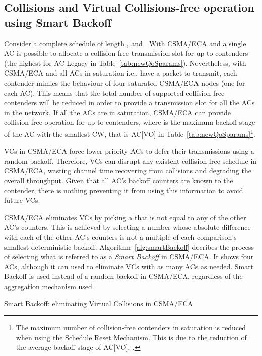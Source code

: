 \documentclass[a4paper]{article}
\begin{document}
\subsection{Collisions and Virtual Collisions-free operation using Smart Backoff}\label{ECAqosCollisionFree}
Consider a complete schedule of length , and . With CSMA/ECA and a single AC is possible to allocate a collision-free transmission slot for up to  contenders (the highest  for AC Legacy in Table~\ref{tab:newQoSparams}). Nevertheless, with CSMA/ECA and all ACs in saturation i.e., have a packet to transmit, each contender mimics the behaviour of four saturated CSMA/ECA nodes (one for each AC). This means that the total number of supported collision-free contenders will be reduced in order to provide a transmission slot for all the ACs in the network. If all the ACs are in saturation, CSMA/ECA can provide collision-free operation for up to  contenders, where  is the maximum backoff stage of the AC with the smallest CW, that is AC[VO] in Table~\ref{tab:newQoSparams}\footnote{The maximum number of collision-free contenders in saturation is reduced when using the Schedule Reset Mechanism. This is due to the reduction of the average backoff stage of AC[VO], .}. 



VCs in CSMA/ECA force lower priority ACs to defer their transmissions using a random backoff. Therefore, VCs can disrupt any existent collision-free schedule in CSMA/ECA, wasting channel time recovering from collisions and degrading the overall throughput. Given that all AC's backoff counters are known to the contender, there is nothing preventing it from using this information to avoid future VCs.

CSMA/ECA eliminates VCs by picking a  that is not equal to any of the other AC's counters. This is achieved by selecting a number whose absolute difference with each of the other AC's counters is not a multiple of each comparison's smallest deterministic backoff. Algorithm~\ref{alg:smartBackoff} decribes the process of selecting what is referred to as a \emph{Smart Backoff} in CSMA/ECA. It shows four ACs, although it can used to eliminate VCs with as many ACs as needed. Smart Backoff is used instead of a random backoff in CSMA/ECA, regardless of the aggregation mechanism used.



\begin{center}
\begin{minipage}{0.7\linewidth}
	\begin{algorithm}[H]
		\;
		\;
		\tcp{}\tcp{}
		{
			\;
			\For{}
			{
			}
		}
		\Return \;
		\vspace{0.2cm}
		\caption{Smart Backoff: eliminating Virtual Collisions in CSMA/ECA}
		\label{alg:smartBackoff}
	\end{algorithm}
\end{minipage}
\end{center}
\end{document}
